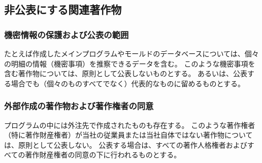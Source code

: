 \subsection{非公表にする関連著作物}

\subsubsection{機密情報の保護および公表の範囲\label{subsec:notopenwork}}
たとえば作成したメインプログラムやモールドのデータベースについては、個々の明細の情報（機密事項）を推察できるデータを含む。
このような機密事項を含む著作物については、原則として公表しないものとする。
あるいは、公表する場合でも（個々のものすべてでなく）代表的なものに留めるものとする。

\subsubsection{外部作成の著作物および著作権者の同意\label{subsec:copyrightsSubcontractor}}
プログラムの中には外注先で作成されたものも存在する。
このような著作権者（特に著作財産権者）が当社の従業員または当社自体ではない著作物については、原則として公表しない。
公表する場合は、すべての著作人格権者およびすべての著作財産権者の同意の下に行われるものとする。



